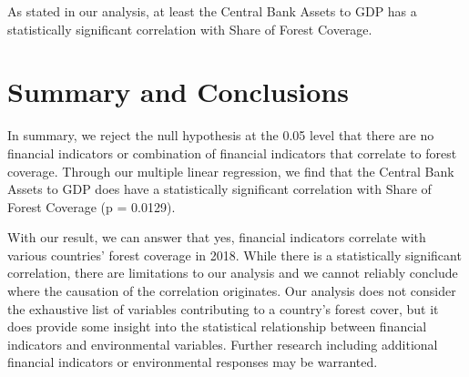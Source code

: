 \documentclass[
  12pt,
]{article}
\begin{document}
As stated in our analysis, at least the Central Bank Assets to GDP has a
statistically significant correlation with Share of Forest Coverage.

\newpage

\hypertarget{summary-and-conclusions}{%
\section{Summary and Conclusions}\label{summary-and-conclusions}}

In summary, we reject the null hypothesis at the 0.05 level that there
are no financial indicators or combination of financial indicators that
correlate to forest coverage. Through our multiple linear regression, we
find that the Central Bank Assets to GDP does have a statistically
significant correlation with Share of Forest Coverage (p = 0.0129).

With our result, we can answer that yes, financial indicators correlate
with various countries' forest coverage in 2018. While there is a
statistically significant correlation, there are limitations to our
analysis and we cannot reliably conclude where the causation of the
correlation originates. Our analysis does not consider the exhaustive
list of variables contributing to a country's forest cover, but it does
provide some insight into the statistical relationship between financial
indicators and environmental variables. Further research including
additional financial indicators or environmental responses may be
warranted.
\end{document}
